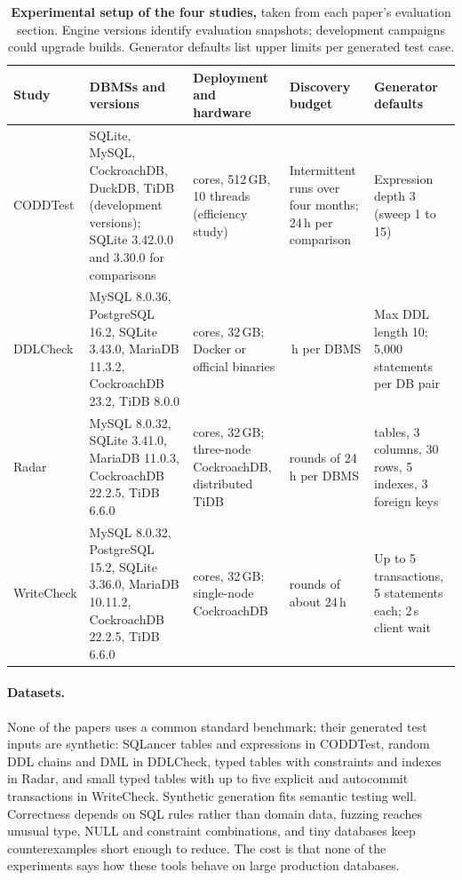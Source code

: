 \begin{table}[!tb]
\caption{\textbf{Experimental setup of the four studies,} taken from each paper's evaluation section. Engine versions identify evaluation snapshots; development campaigns could upgrade builds. Generator defaults list upper limits per generated test case.}
\label{tab:glance}
\centering\footnotesize\renewcommand{\arraystretch}{1.12}
\begin{tabularx}{\linewidth}{@{}l>{\raggedright\arraybackslash}X>{\raggedright\arraybackslash}p{3.5cm}>{\raggedright\arraybackslash}p{3.1cm}>{\raggedright\arraybackslash}p{3.5cm}@{}}
\toprule
\textbf{Study} & \textbf{DBMSs and versions} & \textbf{Deployment and hardware} & \textbf{Discovery budget} & \textbf{Generator defaults} \\
\midrule
CODDTest & SQLite, MySQL, CockroachDB, DuckDB, TiDB (development versions); SQLite 3.42.0.0 and 3.30.0 for comparisons & 64 cores, 512\,GB, 10 threads (efficiency study) & Intermittent runs over four months; 24\,h per comparison & Expression depth 3 (sweep 1 to 15) \\
DDLCheck & MySQL 8.0.36, PostgreSQL 16.2, SQLite 3.43.0, MariaDB 11.3.2, CockroachDB 23.2, TiDB 8.0.0 & 8 cores, 32\,GB; Docker or official binaries & 24\,h per DBMS & Max DDL length 10; 5,000 statements per DB pair \\
Radar & MySQL 8.0.32, SQLite 3.41.0, MariaDB 11.0.3, CockroachDB 22.2.5, TiDB 6.6.0 & 8 cores, 32\,GB; three-node CockroachDB, distributed TiDB & 10 rounds of 24\,h per DBMS & 3 tables, 3 columns, 30 rows, 5 indexes, 3 foreign keys \\
WriteCheck & MySQL 8.0.32, PostgreSQL 15.2, SQLite 3.36.0, MariaDB 10.11.2, CockroachDB 22.2.5, TiDB 6.6.0 & 8 cores, 32\,GB; single-node CockroachDB & 5 rounds of about 24\,h & Up to 5 transactions, 5 statements each; 2\,s client wait \\
\bottomrule
\end{tabularx}
\end{table}

\paragraph{Datasets.} None of the papers uses a common standard benchmark; their generated test inputs are synthetic: SQLancer tables and expressions in CODDTest, random DDL chains and DML in DDLCheck, typed tables with constraints and indexes in Radar, and small typed tables with up to five explicit and autocommit transactions in WriteCheck. Synthetic generation fits semantic testing well. Correctness depends on SQL rules rather than domain data, fuzzing reaches unusual type, NULL and constraint combinations, and tiny databases keep counterexamples short enough to reduce. The cost is that none of the experiments says how these tools behave on large production databases.

